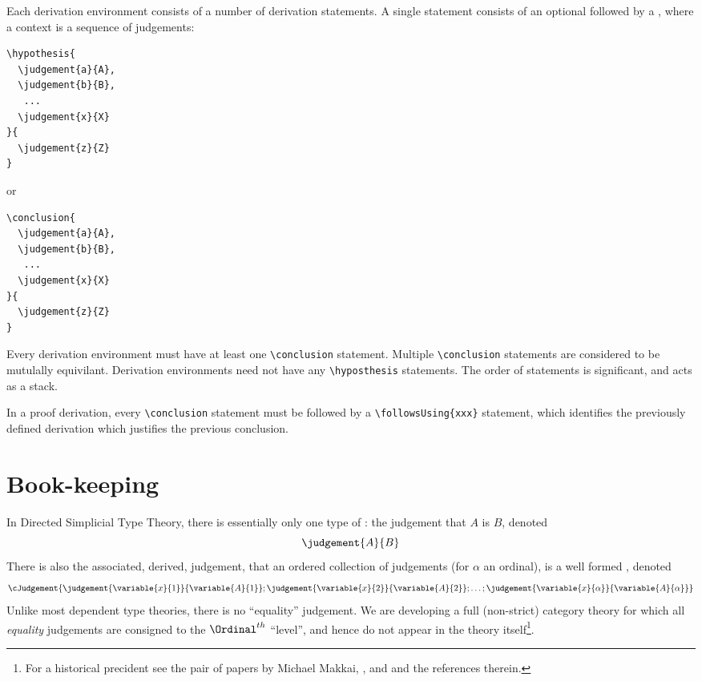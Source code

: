 \documentclass[a4paper,openany]{amsbook}
\begin{document}
Each derivation environment consists of a number of derivation statements. A
single statement consists of an optional  followed by a
, where a context is a sequence of judgements:
\begin{verbatim}
\hypothesis{
  \judgement{a}{A}, 
  \judgement{b}{B},
   ...
  \judgement{x}{X}
}{
  \judgement{z}{Z}
}
\end{verbatim}
or
\begin{verbatim}
\conclusion{
  \judgement{a}{A}, 
  \judgement{b}{B},
   ...
  \judgement{x}{X}
}{
  \judgement{z}{Z}
}
\end{verbatim}

Every derivation environment must have at least one \verb|\conclusion|
statement. Multiple \verb|\conclusion| statements are considered to be mutulally
equivilant. Derivation environments need not have any \verb|\hyposthesis|
statements.  The order of statements is significant, and acts as a stack.

In a proof derivation, every \verb|\conclusion| statement must be followed by a
\verb|\followsUsing{xxx}| statement, which identifies the previously defined
derivation which justifies the previous conclusion.

\chapter{Book-keeping}

In Directed Simplicial Type Theory, there is essentially only one type of
: the judgement that $A$ is  $B$, denoted
$$\judgement{A}{B}$$ There is also the associated, derived, judgement, that an 
ordered collection of judgements (for $\alpha$ an ordinal), %
is a well formed , denoted %
$$\cJudgement{ %
  \judgement{\variable{x}{1}}{\variable{A}{1}} ; %
  \judgement{\variable{x}{2}}{\variable{A}{2}} ; %
  \ldots ; %
  \judgement{\variable{x}{\alpha}}{\variable{A}{\alpha}} %
}$$ %
Unlike most dependent type theories, there is no ``equality'' judgement. We are
developing a full (non-strict) category theory for which all \emph{equality}
judgements are consigned to the $\Ordinal^{th}$ ``level'', and hence do not
appear in the theory itself\footnote{For a historical precident see the pair of
papers by Michael Makkai, \cite{makkai1995FOLDS}, and
\cite{makkai1998catFound} and the references therein.}.
\end{document}
